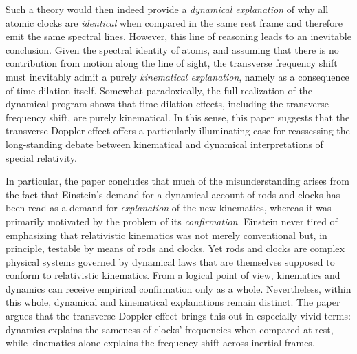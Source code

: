 \documentclass[pdflatex,sn-basic]{sn-jnl}
\newcommand{\tDe}{transverse Doppler effect\xspace}
\begin{document}
Such a theory would then indeed provide a \emph{dynamical explanation} of why all atomic clocks are \emph{identical} when compared in the same rest frame and therefore emit the same spectral lines. However, this line of reasoning leads to an inevitable conclusion. Given the spectral identity of atoms, and assuming that there is no contribution from motion along the line of sight, the transverse frequency shift must inevitably admit a purely \emph{kinematical explanation}, namely as a consequence of time dilation itself. Somewhat paradoxically, the full realization of the dynamical program shows that time-dilation effects, including the transverse frequency shift, are purely kinematical. In this sense, this paper suggests that the \tDe offers a particularly illuminating case for reassessing the long-standing debate between kinematical and dynamical interpretations of special relativity. 

In particular, the paper concludes that much of the misunderstanding arises from the fact that Einstein’s demand for a dynamical account of rods and clocks has been read as a demand for \emph{explanation} of the new kinematics, whereas it was primarily motivated by the problem of its \emph{confirmation}. Einstein never tired of emphasizing that relativistic kinematics was not merely conventional but, in principle, testable by means of rods and clocks. Yet rods and clocks are complex physical systems governed by dynamical laws that are themselves supposed to conform to relativistic kinematics. From a logical point of view, kinematics and dynamics can receive empirical confirmation only as a whole. Nevertheless, within this whole, dynamical and kinematical explanations remain distinct. The paper argues that the \tDe brings this out in especially vivid terms: dynamics explains the sameness of clocks’ frequencies when compared at rest, while kinematics alone explains the frequency shift across inertial frames.
\end{document}
